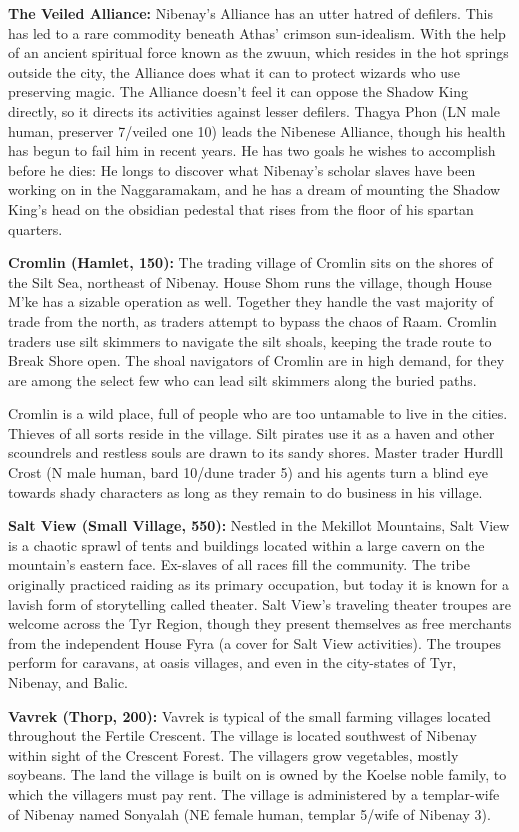 {	\textbf{The Veiled Alliance:} Nibenay's Alliance has an utter hatred of defilers. This has led to a rare commodity beneath Athas' crimson sun-idealism. With the help of an ancient spiritual force known as the zwuun, which resides in the hot springs outside the city, the Alliance does what it can to protect wizards who use preserving magic. The Alliance doesn't feel it can oppose the Shadow King directly, so it directs its activities against lesser defilers. Thagya Phon (LN male human, preserver 7/veiled one 10) leads the Nibenese Alliance, though his health has begun to fail him in recent years. He has two goals he wishes to accomplish before he dies: He longs to discover what Nibenay's scholar slaves have been working on in the Naggaramakam, and he has a dream of mounting the Shadow King's head on the obsidian pedestal that rises from the floor of his spartan quarters.
}
{
	\textbf{Cromlin (Hamlet, 150):} The trading village of Cromlin sits on the shores of the Silt Sea, northeast of Nibenay. House Shom runs the village, though House M'ke has a sizable operation as well. Together they handle the vast majority of trade from the north, as traders attempt to bypass the chaos of Raam. Cromlin traders use silt skimmers to navigate the silt shoals, keeping the trade route to Break Shore open. The shoal navigators of Cromlin are in high demand, for they are among the select few who can lead silt skimmers along the buried paths.

	Cromlin is a wild place, full of people who are too untamable to live in the cities. Thieves of all sorts reside in the village. Silt pirates use it as a haven and other scoundrels and restless souls are drawn to its sandy shores. Master trader Hurdll Crost (N male human, bard 10/dune trader 5) and his agents turn a blind eye towards shady characters as long as they remain to do business in his village.

	\textbf{Salt View (Small Village, 550):} Nestled in the Mekillot Mountains, Salt View is a chaotic sprawl of tents and buildings located within a large cavern on the mountain's eastern face. Ex-slaves of all races fill the community. The tribe originally practiced raiding as its primary occupation, but today it is known for a lavish form of storytelling called theater. Salt View's traveling theater troupes are welcome across the Tyr Region, though they present themselves as free merchants from the independent House Fyra (a cover for Salt View activities). The troupes perform for caravans, at oasis villages, and even in the city-states of Tyr, Nibenay, and Balic.

	\textbf{Vavrek (Thorp, 200):} Vavrek is typical of the small farming villages located throughout the Fertile Crescent. The village is located southwest of Nibenay within sight of the Crescent Forest. The villagers grow vegetables, mostly soybeans. The land the village is built on is owned by the Koelse noble family, to which the villagers must pay rent. The village is administered by a templar-wife of Nibenay named Sonyalah (NE female human, templar 5/wife of Nibenay 3).
}
